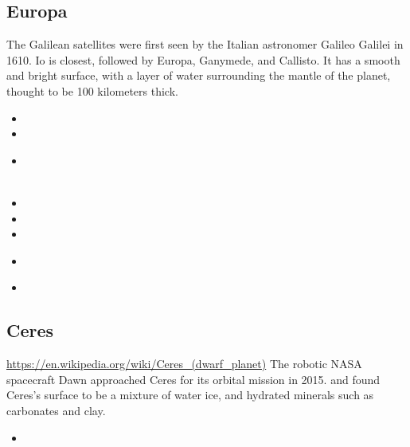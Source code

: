 \subsection{Europa}

The Galilean satellites were first seen by the Italian astronomer Galileo Galilei in 1610. 
Io is closest, followed by Europa, Ganymede, and Callisto.
It has a smooth and bright surface, with a layer of water surrounding the mantle of the planet, 
thought to be 100 kilometers thick.

\begin{scriptsize}
\begin{itemize}
\item[\twothousandtwo] 
\item[\twothousandfour] 
\item[\twothousandfive] 
\\ 
\\ 
\item[\twothousandeight] 
\item[\twothousandten] 
\item[\twothousandeleven] 
\item[\twothousandfourteen] 
 \\
\item[\twothousandnineteen] 
\end{itemize}
\end{scriptsize}



\subsection{Ceres}

\url{https://en.wikipedia.org/wiki/Ceres_(dwarf_planet)}
The robotic NASA spacecraft Dawn approached Ceres for its orbital mission in 2015.
and found Ceres's surface to be a mixture of water ice, and hydrated minerals such as carbonates and clay. 

\begin{scriptsize}
\begin{itemize}
\item[\twothousandtwentytwo] 
\end{itemize}
\end{scriptsize}

